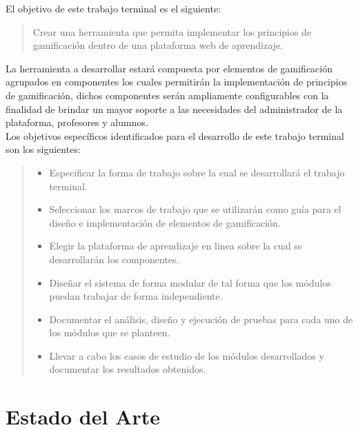  \noindent El objetivo de este trabajo terminal es el siguiente:

    \begin{quote}
    \colorbox{blue!05}{\parbox{\dimexpr\linewidth-2\fboxsep}{\strut
        Crear una herramienta que permita implementar los principios
        de gamificación dentro de una plataforma web de aprendizaje.
    \strut}}
    \end{quote}

 \noindent La herramienta a desarrollar estará compuesta por elementos de gamificación agrupados en
 componentes los cuales permitirán la implementación de principios de gamificación, dichos
 componentes serán ampliamente configurables con la finalidad de brindar un mayor soporte a las
 necesidades del administrador de la plataforma, profesores y alumnos.\\

 Los objetivos específicos identificados para el desarrollo de este trabajo terminal son los siguientes:

    \begin{quote}
    \begin{itemize}%
        \item Especificar la forma de trabajo sobre la cual se
              desarrollará el trabajo terminal.

        \item Seleccionar los marcos de trabajo que se utilizarán como
              guía para el diseño e implementación de elementos de gamificación.

        \item Elegir la plataforma de aprendizaje en linea sobre
              la cual se desarrollarán los componentes.

        \item Diseñar el sistema de forma modular de tal forma que los módulos
              puedan trabajar de forma independiente.

        \item Documentar el análisis, diseño y ejecución de pruebas para cada
              uno de los módulos que se planteen.

        \item Llevar a cabo los casos de estudio de los módulos desarrollados y
              documentar los resultados obtenidos.
    \end{itemize}
    \end{quote}

\section{Estado del Arte} \label{sec:estadoArte}

